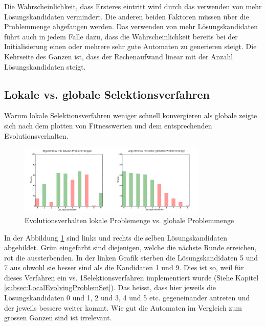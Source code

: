 Die Wahrscheinlichkeit, dass Ersteres eintritt wird durch das verwenden von mehr Lösungskandidaten vermindert. Die anderen beiden Faktoren müssen über die Problemmenge abgefangen werden. Das verwenden von mehr Lösungskandidaten führt auch in jedem Falle dazu, dass die Wahrscheinlichkeit bereits bei der Initialisierung einen oder mehrere sehr gute Automaten zu generieren steigt. Die Kehrseite des Ganzen ist, dass der Rechenaufwand linear mit der Anzahl Lösungskandidaten steigt. 

\subsection{Lokale vs. globale Selektionsverfahren}
Warum lokale Selektionsverfahren weniger schnell konvergieren als globale zeigte sich nach dem plotten von Fitnesswerten und dem entsprechenden Evolutionsverhalten.

\begin{figure}[h]
  \centering
  \includegraphics[width=0.8\textwidth]{images/evolutionsverhalten_lokal_vs_global.pdf}
  \caption[Evolutionsverhalten lokale Problemenge vs. globale Problemmenge]{Evolutionsverhalten lokale Problemenge vs. globale Problemmenge}
  \label{fig:evolutionsverhalten_lokal_vs_global}
\end{figure}

In der Abbildung \ref{fig:evolutionsverhalten_lokal_vs_global} sind links und rechts die selben Lösungskandidaten abgebildet. Grün eingefärbt sind diejenigen, welche die nächste Runde erreichen, rot die aussterbenden. In der linken Grafik sterben die Lösungskandidaten 5 und 7 aus obwohl sie besser sind als die Kandidaten 1 und 9. Dies ist so, weil für dieses Verfahren ein  vs. 1\frqq Selektionsverfahren implementiert wurde (Siehe Kapitel \ref{subsec:LocalEvolvingProblemSet}). Das heisst, dass hier jeweils die Lösungskandidaten 0 und 1, 2 und 3, 4 und 5 etc. gegeneinander antreten und der jeweils bessere weiter kommt. Wie gut die Automaten im Vergleich zum grossen Ganzen sind ist irrelevant.